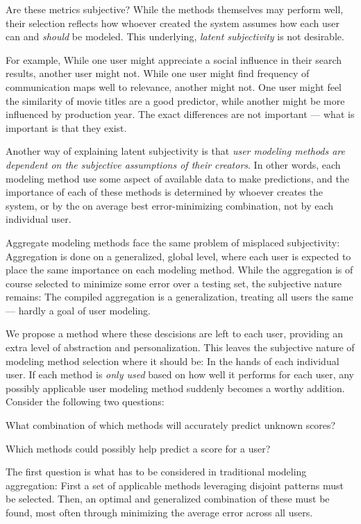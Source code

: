 Are these metrics subjective? 
While the methods themselves may perform well, their selection
reflects how whoever created the system assumes how each user
can and \emph{should} be modeled. This underlying, \emph{latent subjectivity} is not desirable.

For example, While one user might appreciate a social
influence in their search results, another user might not.
While one user might find frequency of communication maps well to relevance,
another might not. 
One user might feel the similarity of movie titles are a good predictor,
while another might be more influenced by production year.
The exact differences are not important --- what is important is that they exist.

Another way of explaining latent subjectivity is that 
\emph{user modeling methods are dependent on the subjective assumptions of their creators}.
In other words, each modeling method use some aspect of available data to make predictions,
and the importance of each of these methods is determined by whoever creates the system,
or by the on average best error-minimizing combination, not by each individual user.

Aggregate modeling methods face the same problem of misplaced subjectivity: 
Aggregation is done on a generalized, global level,
where each user is expected to place the same importance on each modeling method.
While the aggregation is of course selected to minimize some error over a testing set,
the subjective nature remains: The compiled aggregation is a generalization,
treating all users the same --- hardly a goal of user modeling.

We propose a method where these descisions are left to each user,
providing an extra level of abstraction and personalization.
This leaves the subjective nature of modeling method selection where it should be:
In the hands of each individual user.
If each method is \emph{only used} based on how well it performs for each user,
any possibly applicable user modeling method suddenly becomes a worthy addition.
Consider the following two questions:

\begin{enumerate*}
  \item What combination of which methods will accurately predict unknown scores?
  \item Which methods could possibly help predict a score for a user?
\end{enumerate*}

The first question is what has to be considered in traditional modeling aggregation:
First a set of applicable methods leveraging disjoint patterns must be selected. 
Then, an optimal and generalized combination of these must be found,
most often through minimizing the average error across all users.

